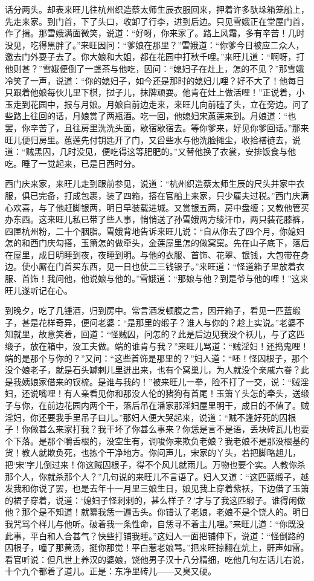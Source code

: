话分两头。却表来旺儿往杭州织造蔡太师生辰衣服回来，押着许多驮垛箱笼船上，先走来家。到门首，下了头口，收卸了行李，进到后边。只见雪娥正在堂屋门首，作了揖。那雪娥满面微笑，说道：“好呀，你来家了。路上风霜，多有辛苦！几时没见，吃得黑胖了。”来旺因问：“爹娘在那里？”雪娥道：“你爹今日被应二众人，邀去门外耍子去了。你大娘和大姐，都在花园中打秋千哩。”来旺儿道：“啊呀，打他则甚？”雪娥便倒了一盏茶与他吃，因问：“媳妇子在灶上，怎的不见？”那雪娥冷笑了一声，说道：“你的媳妇子，如今还是那时的媳妇儿哩？好不大了！他每日只跟着他娘每伙儿里下棋，挝子儿，抹牌顽耍。他肯在灶上做活哩！”正说着，小玉走到花园中，报与月娘。月娘自前边走来，来旺儿向前磕了头，立在旁边。问了些路上往回的话，月娘赏了两瓶酒。吃一回，他媳妇宋蕙莲来到。月娘道：“也罢，你辛苦了，且往房里洗洗头面，歇宿歇宿去。等你爹来，好见你爹回话。”那来旺儿便归房里。蕙莲先付钥匙开了门，又舀些水与他洗脸摊尘，收拾褡裢去，说道：“贼黑囚，几时没见，便吃得这等肥肥的。”又替他换了衣裳，安排饭食与他吃。睡了一觉起来，已是日西时分。

西门庆来家，来旺儿走到跟前参见，说道：“杭州织造蔡太师生辰的尺头并家中衣服，俱已完备，打成包裹，装了四箱，搭在官船上来家，只少雇夫过税。”西门庆满心欢喜，与了他赶脚银两，明日早装载进城。又赏银五两，房中盘缠；又教他管买办东西。这来旺儿私已带了些人事，悄悄送了孙雪娥两方绫汗巾，两只装花膝裤，四匣杭州粉，二十个胭脂。雪娥背地告诉来旺儿说：“自从你去了四个月，你媳妇怎的和西门庆勾搭，玉箫怎的做牵头，金莲屋里怎的做窝窠。先在山子底下，落后在屋里，成日明睡到夜，夜睡到明。与他的衣服、首饰、花翠、银钱，大包带在身边。使小厮在门首买东西，见一日也使二三钱银子。”来旺道：“怪道箱子里放着衣服、首饰！我问他，他说娘与他的。”雪娥道：“那娘与他？到是爷与他的哩！”这来旺儿遂听记在心。

到晚夕，吃了几锺酒，归到房中。常言酒发顿腹之言，因开箱子，看见一匹蓝缎子，甚是花样奇异，便问老婆：“是那里的缎子？谁人与你的？趁上实说。”老婆不知就里，故意笑着，回道：“怪贼囚，问怎的？此是后边见我没个袄儿，与了这匹缎子，放在箱中，没工夫做。端的谁肯与我？”来旺儿骂道：“贼淫妇！还捣鬼哩！端的是那个与你的？”又问：“这些首饰是那里的？”妇人道：“呸！怪囚根子，那个没个娘老子，就是石头罅剌儿里迸出来，也有个窝巢儿，为人就没个亲戚六眷？此是我姨娘家借来的钗梳。是谁与我的！”被来旺儿一拳，险不打了一交，说：“贼淫妇，还说嘴哩！有人亲看见你和那没人伦的猪狗有首尾！玉箫丫头怎的牵头，送缎子与你，在前边花园内两个干，落后吊在潘家那淫妇屋里明干，成日的不值了。贼淫妇，你还要我手里吊子曰儿。”那妇人便大哭起来，说道：“贼不逢好死的囚根子！你做甚么来家打我？我干坏了你甚么事来？你恁是言不是语，丢块砖瓦儿也要个下落。是那个嚼舌根的，没空生有，调唆你来欺负老娘？我老娘不是那没根基的货！教人就欺负死，也拣个干净地方。你问声儿，宋家的丫头，若把脚略趄儿，把‘宋’字儿倒过来！你这贼囚根子，得不个风儿就雨儿。万物也要个实。人教你杀那个人，你就杀那个人？”几句说的来旺儿不言语了。妇人又道：“这匹蓝缎子，越发我和你说了罢，也是去年十一月里三娘生日，娘见我上穿着紫袄，下边借了玉箫的裙子穿着，说道：‘媳妇子怪剌剌的，甚么样子？’才与了我这匹缎子。谁得闲做他？那个是不知道！就纂我恁一遍舌头。你错认了老娘，老娘不是个饶人的。明日我咒骂个样儿与他听。破着我一条性命，自恁寻不着主儿哩。”来旺儿道：“你既没此事，平白和人合甚气？快些打铺我睡。”这妇人一面把铺伸下，说道：“怪倒路的囚根子，噇了那黄汤，挺你那觉！平白惹老娘骂。”把来旺掠翻在炕上，鼾声如雷。看官听说：但凡世上养汉的婆娘，饶他男子汉十八分精细，吃他几句左话儿右说，十个九个都着了道儿。正是：东净里砖儿——又臭又硬。

